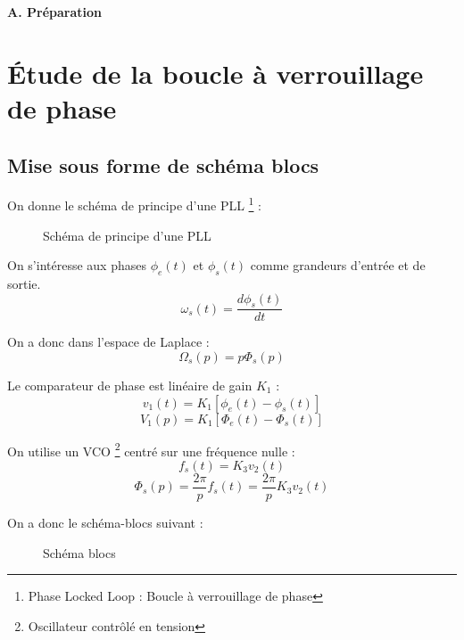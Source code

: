 \documentclass[../../Cours_M1.tex]{subfiles}
\title{\nomTD}
\author{\auteur}
\begin{document}
\maketitle

\begin{center}
\textbf{A. Préparation}
\end{center}

\section{Étude de la boucle à verrouillage de phase}

\subsection{Mise sous forme de schéma blocs}

On donne le schéma de principe d'une PLL \footnote{Phase Locked Loop : Boucle à verrouillage de phase} :

\begin{figure}[h!]
\centering
{}
\caption{Schéma de principe d'une PLL}
\end{figure}

On s'intéresse aux phases $\phi_e(t)$ et $\phi_s(t)$ comme grandeurs d'entrée et de sortie.
\[\omega_s(t) = \frac{d\phi_s(t)}{dt} \]

On a donc dans l'espace de Laplace :
\[ \Omega_s(p) = p\Phi_s(p) \]

Le comparateur de phase est linéaire de gain $K_1$ :
\[ v_1(t) = K_1[\phi_e(t)-\phi_s(t)] \]
\[V_1(p) = K_1[\Phi_e(t)-\Phi_s(t)] \]

On utilise un VCO \footnote{Oscillateur contrôlé en tension} centré sur une fréquence nulle :
\[f_s(t) = K_3v_2(t) \]
\[\Phi_s(p) = \frac{2\pi}{p} f_s(t) = \frac{2\pi}{p}K_3 v_2(t)\]

On a donc le schéma-blocs suivant :
\begin{figure}[h!]
\centering
{}
\caption{Schéma blocs}
\end{figure}
\end{document}
